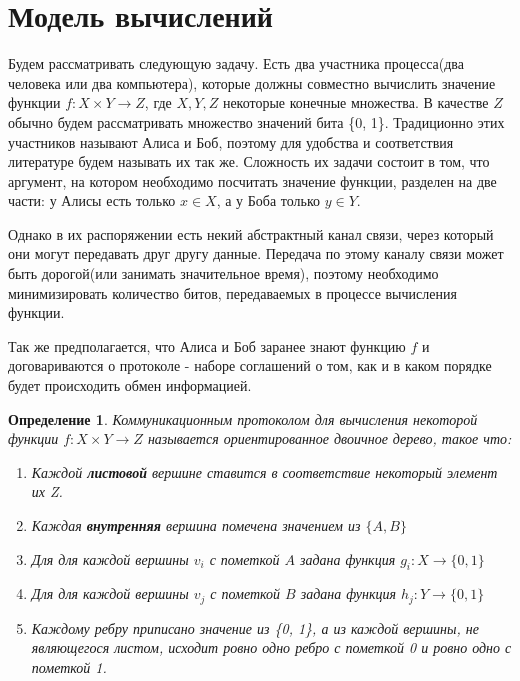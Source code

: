 \documentclass[12pt]{article}
\begin{document}
\tableofcontents
\newpage

\section{Модель вычислений}
\newtheorem{Def}{Определение}

Будем рассматривать следующую задачу.
Есть два участника процесса(два человека или два компьютера), которые должны совместно вычислить значение функции
$ f \colon X \times Y \rightarrow Z $, где $X, Y, Z$ некоторые конечные множества.
В качестве $Z$ обычно будем рассматривать множество значений бита \{0, 1\}.
Традиционно этих участников называют Алиса и Боб,
поэтому для удобства и соответствия литературе будем называть их так же.
Сложность их задачи состоит в том, что аргумент, на котором необходимо посчитать значение функции, разделен на две части:
у Алисы есть только $x \in X$, а у Боба только $y \in Y$.

Однако в их распоряжении есть некий абстрактный канал связи, через который они могут передавать друг другу данные. Передача по этому каналу связи может быть дорогой(или занимать значительное время), поэтому необходимо минимизировать количество битов, передаваемых в процессе вычисления функции.

Так же предполагается, что Алиса и Боб заранее знают функцию $f$ и договариваются о протоколе -
наборе соглашений о том, как и в каком порядке будет происходить обмен информацией.

\begin{Def}
Коммуникационным протоколом для вычисления некоторой функции
$ f \colon X \times Y \rightarrow Z $
называется ориентированное двоичное дерево, такое что:
\begin{enumerate}
    \item
    Каждой \textbf{листовой} вершине ставится в соответствие некоторый элемент их Z.
    \item
    Каждая \textbf{внутренняя} вершина помечена значением из $ \{ A, B \} $
    \item
    Для для каждой вершины $v_i$ с пометкой $A$ задана функция \linebreak
    $ g_i \colon X \rightarrow \{0, 1\} $
    \item
    Для для каждой вершины $v_j$ с пометкой $B$ задана функция \linebreak
    $ h_j \colon Y \rightarrow \{0, 1\} $
    \item
    Каждому ребру приписано значение из \{0, 1\}, а из каждой вершины, не являющегося листом, исходит ровно одно ребро с пометкой 0 и ровно одно с пометкой 1.
\end{enumerate}
\end{Def}
\end{document}
